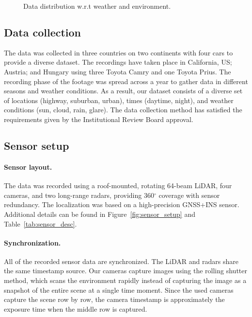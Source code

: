 \documentclass{article}
\begin{document}
\begin{figure}
\begin{floatrow}
{\caption{Data distribution w.r.t weather and environment.}\label{tab:data_distr}
}
\end{floatrow}
\end{figure}

\subsection{Data collection}
\label{datacoll}
The data was collected in three countries on two continents with four cars to provide a diverse dataset. The recordings have taken place in California, US; Austria; and Hungary using three Toyota Camry and one Toyota Prius. The recording phase of the footage was spread across a year to gather data in different seasons and weather conditions. As a result, our dataset consists of a diverse set of locations (highway, suburban, urban), times (daytime, night), and weather conditions (sun, cloud, rain, glare). The data collection method has satisfied the requirements given by the Institutional Review Board approval.

\subsection{Sensor setup}
\paragraph{Sensor layout.} The data was recorded using a roof-mounted, rotating 64-beam LiDAR, four cameras, and two long-range radars, providing 360$^{\circ}$ coverage with sensor redundancy. The localization was based on a high-precision GNSS+INS sensor. Additional details can be found in Figure~\ref{fig:sensor_setup} and Table~\ref{tab:sensor_desc}.

\paragraph{Synchronization.} All of the recorded sensor data are synchronized. The LiDAR and radars share the same timestamp source. Our cameras capture images using the rolling shutter method, which scans the environment rapidly instead of capturing the image as a snapshot of the entire scene at a single time moment. Since the used cameras capture the scene row by row, the camera timestamp is approximately the exposure time when the middle row is captured.
\end{document}
